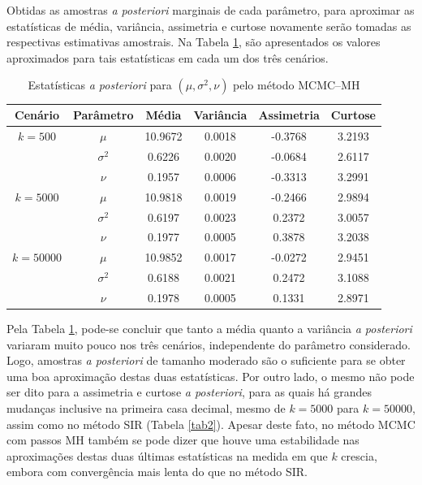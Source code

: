 \documentclass[12pt,reqno,a4paper,oneside]{article}
\begin{document}
Obtidas as amostras \textit{a posteriori} marginais de cada parâmetro, para aproximar as estatísticas de média, variância, assimetria e curtose novamente serão tomadas as respectivas estimativas amostrais. Na Tabela \ref{tab3}, são apresentados os valores aproximados para tais estatísticas em cada um dos três cenários.

\begin{table}[htb]
	\caption{Estatísticas \textit{a posteriori} para $(\mu, \sigma^2, \nu)$ pelo método MCMC--MH}
	\label{tab3}
	\centering
	\begin{tabular}{cccccc}
		\toprule
		Cenário & Parâmetro & Média & Variância & Assimetria & Curtose \\
		\midrule
		$k = 500$ & $\mu$ & 10.9672 & 0.0018 & -0.3768 & 3.2193 \\
		& $\sigma^2$ & 0.6226 & 0.0020 & -0.0684 & 2.6117 \\
		& $\nu$      & 0.1957 & 0.0006 & -0.3313 & 3.2991 \\
		\midrule
		$k = 5000$ & $\mu$ & 10.9818 & 0.0019 & -0.2466 & 2.9894 \\
		& $\sigma^2$ & 0.6197 & 0.0023 & 0.2372 & 3.0057 \\
		& $\nu$      & 0.1977 & 0.0005 & 0.3878 & 3.2038 \\
		\midrule
		$k = 50000$ & $\mu$ & 10.9852 & 0.0017 & -0.0272 & 2.9451 \\
		& $\sigma^2$ & 0.6188 & 0.0021 & 0.2472 & 3.1088 \\
		& $\nu$      & 0.1978 & 0.0005 & 0.1331 & 2.8971 \\
		\bottomrule
	\end{tabular}
\end{table}

Pela Tabela \ref{tab3}, pode-se concluir que tanto a média quanto a variância \textit{a posteriori} variaram muito pouco nos três cenários, independente do parâmetro considerado. Logo, amostras \textit{a posteriori} de tamanho moderado são o suficiente para se obter uma boa aproximação destas duas estatísticas. Por outro lado, o mesmo não pode ser dito para a assimetria e curtose \textit{a posteriori}, para as quais há grandes mudanças inclusive na primeira casa decimal, mesmo de $k=5000$ para $k=50000$, assim como no método SIR (Tabela \ref{tab2}). Apesar deste fato, no método MCMC com passos MH também se pode dizer que houve uma estabilidade nas aproximações destas duas últimas estatísticas na medida em que $k$ crescia, embora com convergência mais lenta do que no método SIR.
\end{document}
